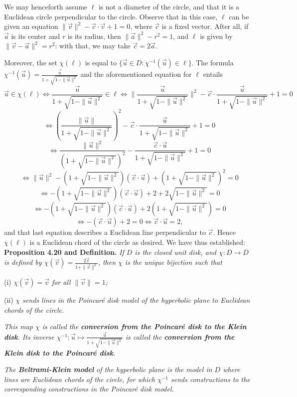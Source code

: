 \documentclass[leqno]{book}
\begin{document}
We may henceforth assume $\ell$ is not a diameter of the circle, and that it is a Euclidean circle perpendicular to the circle.  Observe that in this case, $\ell$ can be given an equation $\|\vec v\|^2-\vec c\cdot\vec v+1=0$, where $\vec c$ is a fixed vector.  After all, if $\vec a$ is its center and $r$ is its radius, then $\|\vec a\|^2-r^2=1$, and $\ell$ is given by $\|\vec v-\vec a\|^2=r^2$: with that, we may take $\vec c=2\vec a$.

Moreover, the set $\chi(\ell)$ is equal to $\{\vec u\in D:\chi^{-1}(\vec u)\in\ell\}$.  The formula $\chi^{-1}(\vec u)=\frac{\vec u}{1+\sqrt{1-\|\vec u\|^2}}$ and the aforementioned equation for $\ell$ entails
$$\vec u\in\chi(\ell)\iff\frac{\vec u}{1+\sqrt{1-\|\vec u\|^2}}\in\ell\iff\big\|\frac{\vec u}{1+\sqrt{1-\|\vec u\|^2}}\big\|^2-\vec c\cdot\frac{\vec u}{1+\sqrt{1-\|\vec u\|^2}}+1=0$$
$$\iff\left(\frac{\|\vec u\|}{1+\sqrt{1-\|\vec u\|^2}}\right)^2-\vec c\cdot\frac{\vec u}{1+\sqrt{1-\|\vec u\|^2}}+1=0$$
$$\iff\frac{\|\vec u\|^2}{(1+\sqrt{1-\|\vec u\|^2})^2}-\frac{\vec c\cdot\vec u}{1+\sqrt{1-\|\vec u\|^2}}+1=0$$
$$\iff\|\vec u\|^2-(1+\sqrt{1-\|\vec u\|^2})(\vec c\cdot\vec u)+(1+\sqrt{1-\|\vec u\|^2})^2=0$$
$$\iff-(1+\sqrt{1-\|\vec u\|^2})(\vec c\cdot\vec u)+2+2\sqrt{1-\|\vec u\|^2}=0$$
$$\iff-(1+\sqrt{1-\|\vec u\|^2})(\vec c\cdot\vec u)+2(1+\sqrt{1-\|\vec u\|^2})=0$$
$$\iff-(\vec c\cdot\vec u)+2=0\iff\vec c\cdot\vec u=2,$$
and that last equation describes a Euclidean line perpendicular to $\vec c$.  Hence $\chi(\ell)$ is a Euclidean chord of the circle as desired.  We have thus established:\\

\noindent\textbf{Proposition 4.20 and Definition.} \emph{If $D$ is the closed unit disk, and $\chi:D\to D$ is defined by $\chi(\vec v)=\frac{2\vec v}{1+\|\vec v\|^2}$, then $\chi$ is the unique bijection such that}

(i) \emph{$\chi(\vec v)=\vec v$ for all $\|\vec v\|=1$;}

(ii) \emph{$\chi$ sends lines in the Poincar\'e disk model of the hyperbolic plane to Euclidean chords of the circle.}

\emph{This map $\chi$ is called the \textbf{conversion from the Poincar\'e disk to the Klein disk}.  Its inverse $\chi^{-1}:\vec u\mapsto\frac{\vec u}{1+\sqrt{1-\|\vec u\|^2}}$ is called the \textbf{conversion from the Klein disk to the Poincar\'e disk}.}

\emph{The \textbf{Beltrami-Klein model} of the hyperbolic plane is the model in $D$ where lines are Euclidean chords of the circle, for which $\chi^{-1}$ sends constructions to the corresponding constructions in the Poincar\'e disk model.}\\
\end{document}
